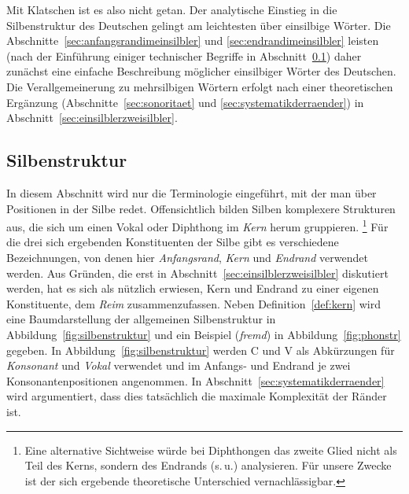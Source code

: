 
Mit Klatschen ist es also nicht getan.
Der analytische Einstieg in die Silbenstruktur des Deutschen gelingt am leichtesten über einsilbige Wörter.
Die Abschnitte~\ref{sec:anfangsrandimeinsilbler} und \ref{sec:endrandimeinsilbler} leisten (nach der Einführung einiger technischer Begriffe in Abschnitt~\ref{sec:silbenstruktur}) daher zunächst eine einfache Beschreibung möglicher einsilbiger Wörter des Deutschen.
Die Verallgemeinerung zu mehrsilbigen Wörtern erfolgt nach einer theoretischen Ergänzung (Abschnitte~\ref{sec:sonoritaet} und \ref{sec:systematikderraender}) in Abschnitt~\ref{sec:einsilblerzweisilbler}.


\subsection{Silbenstruktur}

\label{sec:silbenstruktur}

In diesem Abschnitt wird nur die Terminologie eingeführt, mit der man über Positionen in der Silbe redet.
Offensichtlich bilden Silben komplexere Strukturen aus, die sich um einen Vokal oder Diphthong im \textit{Kern} herum gruppieren.%
\footnote{Eine alternative Sichtweise würde bei Diphthongen das zweite Glied nicht als Teil des Kerns, sondern des Endrands (s.\,u.) analysieren.
Für unsere Zwecke ist der sich ergebende theoretische Unterschied vernachlässigbar.}
Für die drei sich ergebenden Konstituenten der Silbe gibt es verschiedene Bezeichnungen, von denen hier \textit{Anfangsrand}, \textit{Kern} und \textit{Endrand} verwendet werden.
Aus Gründen, die erst in Abschnitt~\ref{sec:einsilblerzweisilbler} diskutiert werden, hat es sich als nützlich erwiesen, Kern und Endrand zu einer eigenen Konstituente, dem \textit{Reim} zusammenzufassen.
Neben Definition~\ref{def:kern} wird eine Baumdarstellung der allgemeinen Silbenstruktur in Abbildung~\ref{fig:silbenstruktur} und ein Beispiel (\textit{fremd}) in Abbildung~\ref{fig:phonstr} gegeben.
In Abbildung~\ref{fig:silbenstruktur} werden C und V als Abkürzungen für \textit{Konsonant} und \textit{Vokal} verwendet und im Anfangs- und Endrand je zwei Konsonantenpositionen angenommen.
In Abschnitt~\ref{sec:systematikderraender} wird argumentiert, dass dies tatsächlich die maximale Komplexität der Ränder ist.

